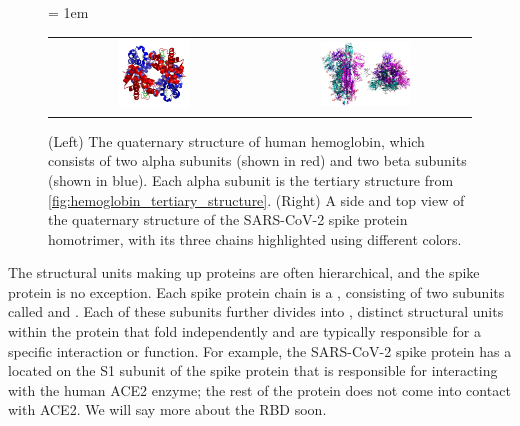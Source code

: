 \begin{figure}[h]
	\centering
	\mySfFamily
	\tabcolsep = 1em
	\begin{tabular}{c c}
	\includegraphics[width = 0.35\textwidth]{../images/hemoglobin_quaternary_structure.png} & \includegraphics[width = 0.45\textwidth]{../images/spike_protein_homotrimer.png}
	\end{tabular}
	\caption{(Left) The quaternary structure of human hemoglobin, which consists of two alpha subunits (shown in red) and two beta subunits (shown in blue). Each alpha subunit is the tertiary structure from \autoref{fig:hemoglobin_tertiary_structure}. (Right) A side and top view of the quaternary structure of the SARS-CoV-2 spike protein homotrimer, with its three chains highlighted using different colors.}
	\label{fig:quaternary_structure}
\end{figure}

The structural units making up proteins are often hierarchical, and the spike protein is no exception. Each spike protein chain is a , consisting of two subunits called  and . Each of these subunits further divides into , distinct structural units within the protein that fold independently and are typically responsible for a specific interaction or function. For example, the SARS-CoV-2 spike protein has a  located on the S1 subunit of the spike protein that is responsible for interacting with the human ACE2 enzyme; the rest of the protein does not come into contact with ACE2. We will say more about the RBD soon.


